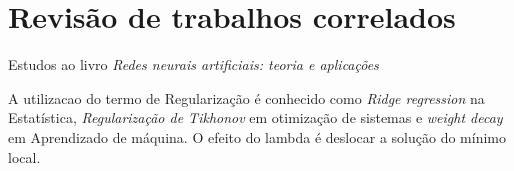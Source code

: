 \section{Revisão de trabalhos correlados}

Estudos ao livro \emph{Redes neurais artificiais: teoria e aplicações} \cite{LivroTexto} 


A utilizacao do termo de Regularização é conhecido como \emph{Ridge regression} na Estatística, \emph{Regularização de Tikhonov} em otimização de sistemas e \emph{weight decay} em Aprendizado de máquina.
O efeito do lambda é deslocar a solução do mínimo local.






